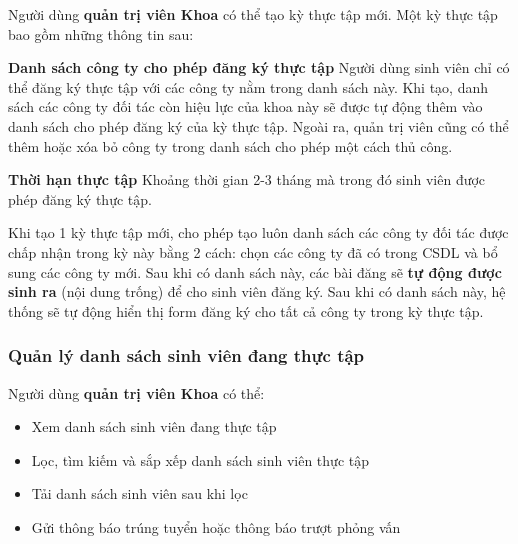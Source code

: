 \documentclass[./../main.tex]{subfiles}
\begin{document}
Người dùng \textbf{quản trị viên Khoa} có thể tạo kỳ thực tập mới. Một
kỳ thực tập bao gồm những thông tin sau:
  

	\textbf{Danh sách công ty cho phép đăng ký thực tập} Người dùng sinh
	viên chỉ có thể đăng ký thực tập với các công ty nằm trong danh sách
	này. Khi tạo, danh sách các công ty đối tác còn hiệu lực của khoa này sẽ
	được tự động thêm vào danh sách cho phép đăng ký của kỳ thực tập. Ngoài
	ra, quản trị viên cũng có thể thêm hoặc xóa bỏ công ty trong danh sách
	cho phép một cách thủ công.
	  
	\textbf{Thời hạn thực tập} Khoảng thời gian 2-3 tháng mà trong đó sinh
	viên được phép đăng ký thực tập.

  
Khi tạo 1 kỳ thực tập mới, cho phép tạo luôn danh sách các công ty đối
tác được chấp nhận trong kỳ này bằng 2 cách: chọn các công ty đã có
trong CSDL và bổ sung các công ty mới. Sau khi có danh sách này, các bài
đăng sẽ \textbf{tự động được sinh ra} (nội dung trống) để cho sinh viên
đăng ký. Sau khi có danh sách này, hệ thống sẽ tự động hiển thị form
đăng ký cho tất cả công ty trong kỳ thực tập.
  
\hypertarget{quux1ea3n-luxfd-danh-suxe1ch-sinh-viuxean-ux111ang-thux1ef1c-tux1eadp}{%
	\subsubsection{Quản lý danh sách sinh viên đang thực
		tập}\label{quux1ea3n-luxfd-danh-suxe1ch-sinh-viuxean-ux111ang-thux1ef1c-tux1eadp}}
  
Người dùng \textbf{quản trị viên Khoa} có thể:
  
\begin{itemize}
	\item
	      
	      	Xem danh sách sinh viên đang thực tập
	      
	\item
	      
	      	Lọc, tìm kiếm và sắp xếp danh sách sinh viên thực tập
	      
	\item
	      
	      	Tải danh sách sinh viên sau khi lọc
	      
	\item
	      
	      	Gửi thông báo trúng tuyển hoặc thông báo trượt phỏng vấn
	      
\end{itemize}
\end{document}
